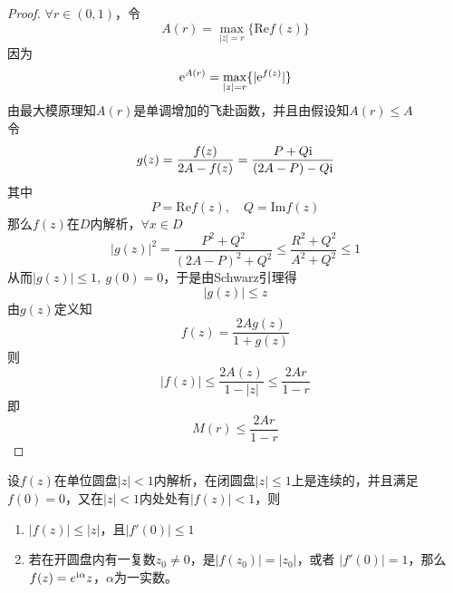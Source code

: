 \begin{proof}
    
    $\forall r \in (0,1)$，令
    $$A(r) = \max_{|z|=r}\{\mathrm{Re}f(z)\}$$
    因为
    $$\mathrm{e}^{A(r)} = \max_{|z|=r}\{|\mathrm{e}^{f(z)}|\}$$
    由最大模原理知$A(r)$是单调增加的飞赴函数，并且由假设知$A(r) \leq A$\\
    令
    $$ g(z) = \dfrac{f(z)}{2A - f(z)} = \dfrac{P + Q\mathrm{i}}{(2A-P)-Q\mathrm{i}} $$
    其中
    $$ P = \mathrm{Re}f(z),\quad Q = \mathrm{Im}f(z) $$
    那么$f(z)$在$D$内解析，$\forall x\in D$
    $$|g(z)|^2 = \dfrac{P^2 + Q^2}{(2A-P)^2 + Q^2} \leq \dfrac{R^2 + Q^2}{A^2 + Q^2} \leq 1$$
    从而$|g(z)| \leq 1,\ g(0) = 0$，于是由\textup{Schwarz}引理得
    $$|g(z) | \leq z$$
    由$g(z)$定义知
    $$f(z) = \dfrac{2Ag(z)}{1 + g(z)}$$
    则
    $$ |f(z)| \leq \dfrac{2A(z)}{1-|z|} \leq \dfrac{2Ar}{1-r}$$
    即
    $$M(r) \leq \dfrac{2Ar}{1-r}$$

\end{proof}

\begin{lemma}[Schwarz引理]
    
    设$f(z)$在单位圆盘$|z|<1$内解析，在闭圆盘$|z| \leq 1$上是连续的，并且满足$f(0) = 0$，又在$|z| < 1$内处处有$|f(z)| < 1$，则

    \begin{enumerate}
        
        \item 
            $|f(z)| \leq |z|$，且$|f'(0)| \leq 1$
        
        \item 
            若在开圆盘内有一复数$z_0 \neq 0$，是$|f(z_0)| = |z_0|$，或者 $|f'(0)| = 1$，那么$f(z) = e^{\mathrm{i}\alpha}z$，$\alpha$为一实数。
        
    \end{enumerate}

\end{lemma}

